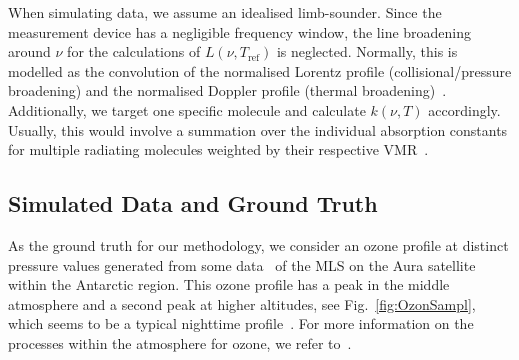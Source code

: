 \documentclass{article}
\begin{document}
When simulating data, we assume an idealised limb-sounder.
Since the measurement device has a negligible frequency window, the line broadening around $\nu$ for the calculations of $L(\nu, T_{\text{ref}})$ is neglected.
Normally, this is modelled as the convolution of the normalised Lorentz profile (collisional/pressure broadening) and the normalised Doppler profile (thermal broadening)~\cite{mipas2000handbook}.
Additionally, we target one specific molecule and calculate $k(\nu, T)$ accordingly.
Usually, this would involve a summation over the individual absorption constants for multiple radiating molecules weighted by their respective VMR~\cite{mipas2000handbook}.


\subsection{Simulated Data and Ground Truth}
\label{sec:SimDat}
As the ground truth for our methodology, we consider an ozone profile at distinct pressure values generated from some data~\cite{MLSdata} of the MLS on the Aura satellite within the Antarctic region.
This ozone profile has a peak in the middle atmosphere and a second peak at higher altitudes, see Fig.~\ref{fig:OzonSampl}, which seems to be a typical nighttime profile~\cite{Lee2020NightOzone}.
For more information on the processes within the atmosphere for ozone, we refer to~\cite{Lee2020NightOzone}.
\end{document}
